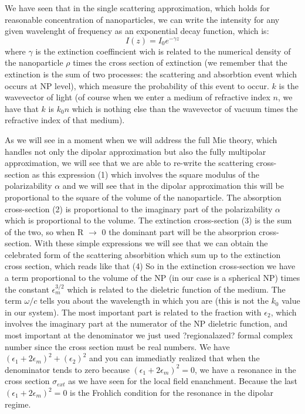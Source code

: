 \documentclass[../main/main.tex]{subfiles}
\begin{document}
We have seen that in the single scattering approximation, which holds for reasonable concentration of nanoparticles, we can write the intensity for any given wavelenght of frequency as an exponential decay function, which is:
$$
I(z) = I_0 e^{-\gamma z}
$$
where $\gamma$ is the extinction coeffincient wich is related to the numerical density of the nanoparticle $\rho$ times the cross section of extinction (we remember that the extinction is the sum of two processes: the scattering and absorbtion event which occurs at NP level), which measure the probability of this event to occur.
$k$ is the wavevector of light (of course when we enter a medium of refractive index $n$, we have that $k$ is $k_0 n$ which is nothing else than the wavevector of vacuum times the refractive index of that medium).

As we will see in a moment when we will address the full Mie theory, which handles not only the dipolar approximation but also the fully multipolar approximation, we will see that we are able to re-write the scattering cross-section as this expression  (1) which involves the square modulus of the polarizability $\alpha$ and we will see that in the dipolar approximation this will be proportional to the square of the volume of the nanoparticle. The absorption cross-section (2) is proportional to the imaginary part of the polarizability $\alpha$ which is proportional to the volume.
The extinction cross-section (3) is the sum of the two, so when R $\rightarrow$ 0 the dominant part will be the absorprion cross-section.
With these simple expressions we will see that we can obtain the celebrated form of the scattering absorbition which sum up to the extinction cross section, which reads like that (4)
So in the extinction cross-section we have a term proportional to the volume of the NP (in our case is a spherical NP) times the constant $\epsilon_m^{3/2}$ which is related to the dieletric function of the medium. The term $\omega/c$ tells you about the wavelength in which you are (this is not the $k_0$ value in our system). The most important part is related to the fraction with $\epsilon_2$, which involves the imaginary part at the numerator of the NP dieletric function, and most important at the denominator we just used ?regionalazed? formal complex number since the cross section must be real numbers.
We have  $(\epsilon_1 + 2 \epsilon_m)^2 + (\epsilon_2)^2$ and you can immediatly realized that when the denominator tends to zero because \(  (\epsilon_1 + 2 \epsilon_m)^2 = 0 \), we have a resonance in the cross section \( \sigma _{ext} \) as we have seen for the local field enanchment. Because the last \(  (\epsilon_1 + 2 \epsilon_m)^2 = 0 \) is the Frohlich condition for the resonance in the dipolar regime.
\end{document}
